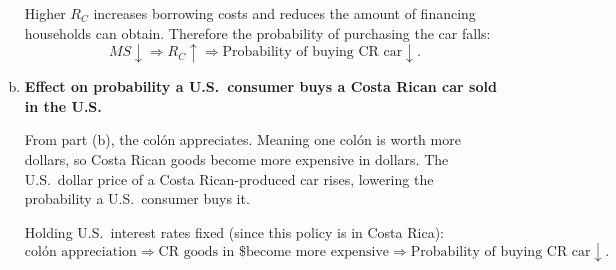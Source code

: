 \documentclass[11pt]{article}
\newenvironment{problem}[2][Problem]{\begin{trivlist}
\item[\hskip \labelsep {\bfseries #1}\hskip \labelsep {\bfseries #2.}]
\leavevmode\par
}{\end{trivlist}}
\begin{document}
\begin{problem}{1}
\begin{enumerate}[(a)]
Higher $R_C$ increases borrowing costs and reduces the amount of financing households can obtain.
Therefore the probability of purchasing the car falls:
\[
MS\downarrow \Rightarrow R_C\uparrow \Rightarrow \text{Probability of buying CR car}\downarrow.
\]

\item \textbf{Effect on probability a U.S.\ consumer buys a Costa Rican car sold in the U.S.}

From part (b), the col\'on appreciates. Meaning one col\'on is worth more dollars, so Costa Rican goods become more expensive in dollars. The U.S.\ dollar price of a Costa Rican-produced car rises, lowering the probability a U.S.\ consumer buys it.

Holding U.S.\ interest rates fixed (since this policy is in Costa Rica):
\[
\text{col\'on appreciation} \Rightarrow \text{CR goods in \$ become more expensive} \Rightarrow \text{Probability of buying CR car}\downarrow.
\]
\end{enumerate}
\end{problem}
\end{document}
